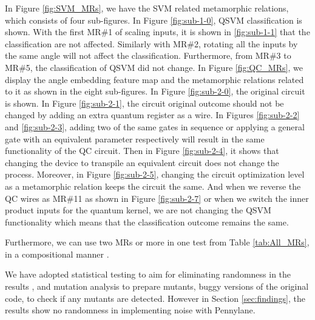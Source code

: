 \documentclass[12pt,a4paper]{article}
\begin{document}
	In Figure \ref{fig:SVM_MRs}, we have the SVM related metamorphic relations, which consists of four sub-figures. In Figure \ref{fig:sub-1-0}, QSVM classification is shown. With the first MR\#1 of scaling inputs, it is shown in \ref{fig:sub-1-1} that the classification are not affected. Similarly with MR\#2, rotating all the inputs by the same angle will not affect the classification. Furthermore, from MR\#3 to MR\#5, the classification of QSVM did not change. In Figure \ref{fig:QC_MRs}, we display the angle embedding feature map and the metamorphic relations related to it as shown in the eight sub-figures. In Figure \ref{fig:sub-2-0}, the original circuit is shown. In Figure \ref{fig:sub-2-1}, the circuit original outcome should not be changed by adding an extra quantum register as a wire. In Figures \ref{fig:sub-2-2} and \ref{fig:sub-2-3}, adding two of the same gates in sequence or applying a general gate with an equivalent parameter respectively will result in the same functionality of the QC circuit. Then in Figure \ref{fig:sub-2-4}, it shows that changing the device to transpile an equivalent circuit does not change the process. Moreover, in Figure \ref{fig:sub-2-5}, changing the circuit optimization level as a metamorphic relation keeps the circuit the same. And when we reverse the QC wires as MR\#11 as shown in Figure \ref{fig:sub-2-7} or when we switch the inner product inputs for the quantum kernel, we are not changing the QSVM functionality which means that the classification outcome remains the same.
	
	Furthermore, we can use two MRs or more in one test from Table \ref{tab:All_MRs}, in a compositional manner \cite{mjia2020}.
	
	We have adopted statistical testing \cite{9159089} to aim for eliminating randomness in the results \cite{10.1145/1985793.1985795}, and mutation analysis to prepare mutants, buggy versions of the original code, to check if any mutants are detected. However in Section \ref{sec:findings}, the results show no randomness in implementing noise with Pennylane. 
	
\end{document}
